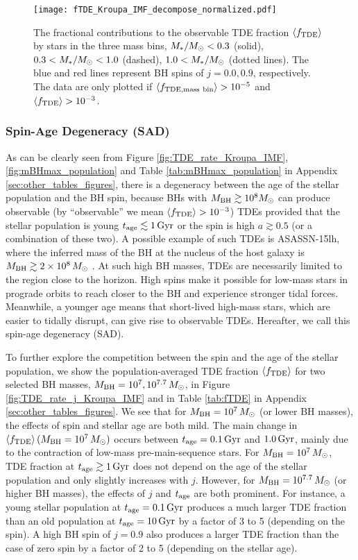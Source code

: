 \documentclass[useAMS,usenatbib]{mn2e}
\def\msun{M_{\rm \odot}}
\def\mstar{M_*}
\def\mBH{M_{\rm BH}}
\def\fTDE{f_{\rm TDE}}
\def\tage{t_{\rm age}}
\def\Gyr{{\rm Gyr}}
\newcommand{\lara}[1]{\left\langle{#1}\right\rangle}
\begin{document}
\begin{figure}
    \centering
    \texttt{[image: fTDE\_Kroupa\_IMF\_decompose\_normalized.pdf]}
    \caption{
    The fractional contributions to the observable TDE fraction $\lara{\fTDE}$ by stars in the three mass bins, $\mstar/\msun<0.3$ (solid), $0.3<\mstar/\msun<1.0$ (dashed), $1.0<\mstar/\msun$ (dotted lines).
    The blue and red lines represent BH spins of $j=0.0,0.9$, respectively.
    The data are only plotted if $\lara{f_{\rm TDE,mass\ bin}}>10^{-5}$ and $\lara{\fTDE}>10^{-3}$.
    }
    \label{fig:fTDE_decomposed}
\end{figure}

\subsubsection{Spin-Age Degeneracy (SAD)}\label{sec:age_spin_degeneracy}

As can be clearly seen from Figure \ref{fig:TDE_rate_Kroupa_IMF}, \ref{fig:mBHmax_population} and Table \ref{tab:mBHmax_population} in Appendix \ref{sec:other_tables_figures}, there is a degeneracy between the age of the stellar population and the BH spin, because BHs with $\mBH\gtrsim 10^8\msun$ can produce observable (by ``observable'' we mean $\lara{\fTDE}>10^{-3}$) TDEs provided that the stellar population is young $\tage\lesssim 1\rm\, Gyr$ or the spin is high $a\gtrsim 0.5$ (or a combination of these two). A possible example of such TDEs is ASASSN-15lh, where the inferred mass of the BH at the nucleus of the host galaxy is $\mBH\gtrsim2\times10^8\,\msun$ \citep{leloudas16_AS15lh}. At such high BH masses, TDEs are necessarily limited to the region close to the horizon. High spins make it possible for low-mass stars in prograde orbits to reach closer to the BH and experience stronger tidal forces. Meanwhile, a younger age means that short-lived high-mass stars, which are easier to tidally disrupt, can give rise to observable TDEs. Hereafter, we call this spin-age degeneracy (SAD).

To further explore the competition between the spin and the age of the stellar population, we show the population-averaged TDE fraction $\lara{\fTDE}$ for two selected BH masses, $\mBH=10^7,10^{7.7}\,\msun$, in Figure \ref{fig:TDE_rate_j_Kroupa_IMF} and in Table \ref{tab:fTDE} in Appendix \ref{sec:other_tables_figures}. We see that for $\mBH=10^7\,\msun$ (or lower BH masses), the effects of spin and stellar age are both mild. The main change in $\lara{\fTDE}(\mBH=10^7\,\msun)$ occurs between $\tage=0.1\,\Gyr$ and $1.0\,\Gyr$, mainly due to the contraction of low-mass pre-main-sequence stars. For $\mBH=10^7\,\msun$, TDE fraction at $\tage\gtrsim 1\rm\, Gyr$ does not depend on the age of the stellar population and only slightly increases with $j$. However, for $\mBH= 10^{7.7}\,\msun$ (or higher BH masses), the effects of $j$ and $\tage$ are both prominent. For instance, a young stellar population at $\tage=0.1\rm\, Gyr$ produces a much larger TDE fraction than an old population at $\tage=10\rm\,Gyr$ by a factor of 3 to 5 (depending on the spin). A high BH spin of $j=0.9$ also produces a larger TDE fraction than the case of zero spin by a factor of 2 to 5 (depending on the stellar age).
\end{document}
